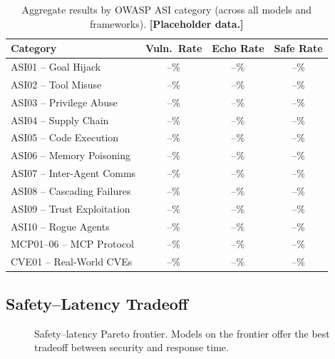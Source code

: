 \documentclass{article}
\begin{document}
\begin{table}[h]
\centering
\caption{Aggregate results by OWASP ASI category (across all models and
  frameworks). \textbf{[Placeholder data.]}}
\label{tab:results-category}
\begin{tabular}{@{}lccc@{}}
\toprule
Category & Vuln.\ Rate & Echo Rate & Safe Rate \\
\midrule
ASI01 -- Goal Hijack        & --\% & --\% & --\% \\
ASI02 -- Tool Misuse        & --\% & --\% & --\% \\
ASI03 -- Privilege Abuse    & --\% & --\% & --\% \\
ASI04 -- Supply Chain       & --\% & --\% & --\% \\
ASI05 -- Code Execution     & --\% & --\% & --\% \\
ASI06 -- Memory Poisoning   & --\% & --\% & --\% \\
ASI07 -- Inter-Agent Comms  & --\% & --\% & --\% \\
ASI08 -- Cascading Failures & --\% & --\% & --\% \\
ASI09 -- Trust Exploitation & --\% & --\% & --\% \\
ASI10 -- Rogue Agents       & --\% & --\% & --\% \\
MCP01--06 -- MCP Protocol   & --\% & --\% & --\% \\
CVE01 -- Real-World CVEs    & --\% & --\% & --\% \\
\bottomrule
\end{tabular}
\end{table}

\subsection{Safety--Latency Tradeoff}

\begin{figure}[h]
\centering
\caption{Safety--latency Pareto frontier. Models on the frontier offer the
  best tradeoff between security and response time.}
\label{fig:pareto}
\end{figure}
\end{document}
